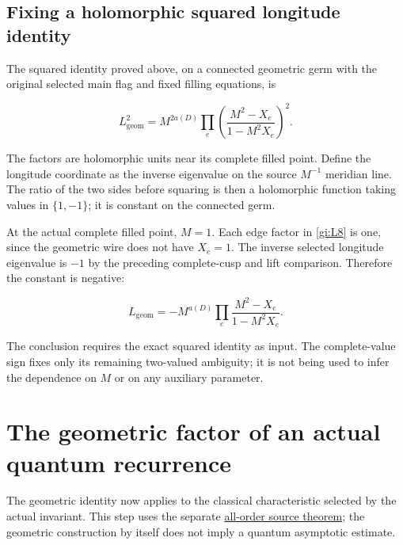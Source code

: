 \subsection{Fixing a holomorphic squared longitude identity}\label{gi:fixing-a-holomorphic-squared-longitude-identity}

The squared identity proved above, on a connected geometric germ
with the original selected main flag and fixed filling equations, is

\begin{equation}\label{gi:L8}
L_{\mathrm{geom}}^2
     =M^{2a(D)}
          \prod_e\left(\frac{M^2-X_e}{1-M^2X_e}\right)^2.
\end{equation}

The factors are holomorphic units near its complete filled point. Define
the longitude coordinate as the inverse eigenvalue on the source
\(M^{-1}\) meridian line. The ratio of the two sides before
squaring is then a holomorphic function taking values in
\(\{1,-1\}\); it is constant on the connected germ.

At the actual complete filled point, \(M=1\).
Each edge factor in \eqref{gi:L8} is one, since the geometric wire does
not have \(X_e=1\). The inverse selected longitude eigenvalue
is \(-1\) by the preceding complete-cusp and lift comparison. Therefore the constant is negative:

\begin{equation}\label{gi:L9}
\boxed{\displaystyle
 L_{\mathrm{geom}}
       =-M^{a(D)}
          \prod_e\frac{M^2-X_e}{1-M^2X_e}.}
\end{equation}

The conclusion requires the exact squared identity as input.
The complete-value sign fixes only its remaining two-valued
ambiguity; it is not being used to infer the dependence on \(M\)
or on any auxiliary parameter.

\section{The geometric factor of an actual quantum recurrence}\label{gi:the-geometric-factor-of-an-actual-quantum-recurrence}

The geometric identity now applies to the classical characteristic
selected by the actual invariant. This step uses the separate
\href{https://sashakolpakov.github.io/murakamis_dream/notes/actual_main_meridian_filtered_characteristic.html}{all-order source theorem};
the geometric construction by itself does not imply a quantum
asymptotic estimate.

